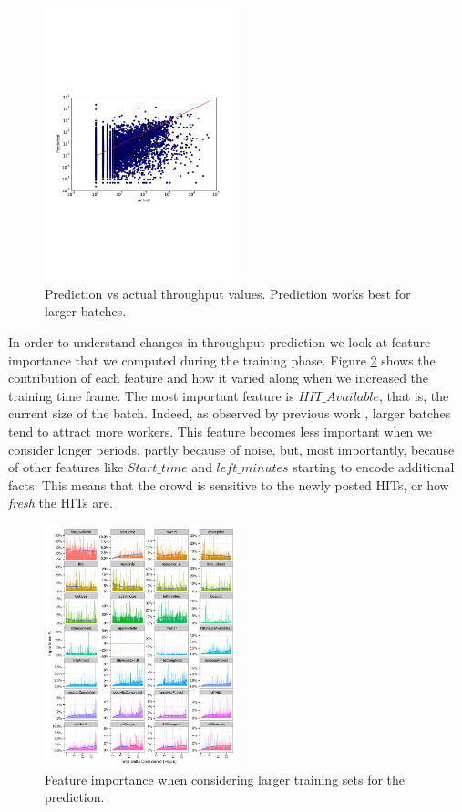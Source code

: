 \begin{figure}[ht]
	\centering
		\includegraphics[width=0.5\textwidth]{figures/predictions_3}
	\caption{Prediction vs actual throughput values. Prediction works best for larger batches.}
	\label{fig:pred}
\end{figure}

In order to understand  changes in throughput prediction we  look at  feature importance that we computed during   the training phase. Figure \ref{fig:importances} shows the  contribution of each feature and how it varied along when we increased the training time frame.
The most important feature is $HIT\_Available$, that is, the current size of the batch. Indeed, as observed by previous work , larger batches tend to attract more workers. This feature becomes less important when we consider longer periods, partly because of  noise, but, most importantly, because of other features like $Start\_time$ and $left\_minutes$ starting to encode additional facts: This means that the crowd is sensitive to the newly posted HITs, or how \emph{fresh} the HITs are.

\begin{figure}[ht]
	\centering
		\includegraphics[width=0.5\textwidth]{figures/importances}
	\caption{Feature importance when considering larger training sets for the prediction.}
	\label{fig:importances}
\end{figure}
